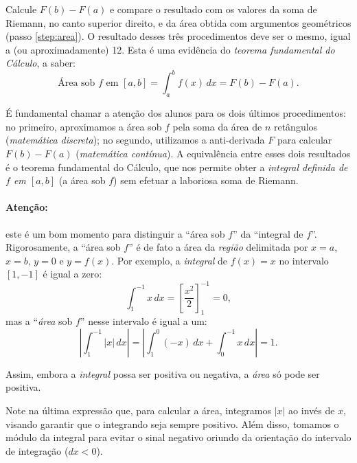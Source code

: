 \documentclass[a4paper,12pt]{scrartcl}
\begin{document}
\begin{list}{.}
      \item Calcule $F(b) - F(a)$ e compare o resultado com os valores da soma de Riemann, no canto superior direito, e da área obtida com argumentos geométricos (passo \ref{step:area}). O resultado desses três procedimentos deve ser o mesmo, igual a (ou aproximadamente) 12. Esta é uma evidência do \emph{teorema fundamental do Cálculo}, a saber:
      \begin{equation}\label{eq:TFC}
       \text{Área sob $f$ em $[a,b]$} = \int_a^b f(x)\,dx = F(b) - F(a).
      \end{equation}
      
      É fundamental chamar a atenção dos alunos para os dois últimos procedimentos: no primeiro, aproximamos a área sob $f$ pela soma da área de $n$ retângulos (\emph{matemática discreta}); no segundo, utilizamos a anti-derivada $F$ para calcular $F(b) - F(a)$ (\emph{matemática contínua}). A equivalência entre esses dois resultados é o teorema fundamental do Cálculo, que nos permite obter a \emph{integral definida de $f$ em $[a,b]$} (a área sob $f$) sem efetuar a laboriosa soma de Riemann.
      
      \paragraph{Atenção:} este é um bom momento para distinguir a ``área sob $f$'' da ``integral de $f$''.
      Rigorosamente, a ``área sob $f$'' é de fato a área da \emph{região} delimitada por $x = a$, $x = b$, $y = 0$ e $y = f(x)$.
      Por exemplo, a \emph{integral} de $f(x) = x$ no intervalo $[1,-1]$ é igual a zero:
      \begin{equation*}
	\int_{1}^{-1} x\, dx = \left[\frac{x^2}{2}\right]_{1}^{-1} = 0,
      \end{equation*}
      mas a ``\emph{área} sob $f$'' nesse intervalo é igual a um:
      \begin{equation*}
	\left|\int_{1}^{-1}|x|\,dx\right| = \left|\int_{1}^{0}(-x)\, dx + \int_{0}^{-1}x\, dx\right| = 1.
      \end{equation*}
      
      Assim, embora a \emph{integral} possa ser positiva ou negativa, a \emph{área} só pode ser positiva.
      
      Note na última expressão que, para calcular a área, integramos $|x|$ ao invés de $x$, visando garantir que o integrando seja sempre positivo.
      Além disso, tomamos o módulo da integral para evitar o sinal negativo oriundo da orientação do intervalo de integração ($dx < 0$).
      
    \end{list}
    
\end{document}

